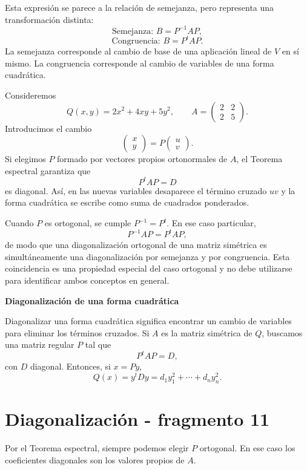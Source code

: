 Esta expresión se parece a la relación de semejanza, pero representa una transformación distinta:
\[
\boxed{\text{Semejanza: }B=P^{-1}AP,}
\]
\[
\boxed{\text{Congruencia: }B=P^tAP.}
\]
La semejanza corresponde al cambio de base de una aplicación lineal de $V$ en sí mismo. La congruencia corresponde al cambio de variables de una forma cuadrática.

\begin{example}
Consideremos
\[
Q(x,y)=2x^2+4xy+5y^2,
\qquad
A=\begin{pmatrix}2&2\\2&5\end{pmatrix}.
\]
Introducimos el cambio
\[
\begin{pmatrix}x\\y\end{pmatrix}
=P\begin{pmatrix}u\\v\end{pmatrix}.
\]
Si elegimos $P$ formado por vectores propios ortonormales de $A$, el Teorema espectral garantiza que
\[
P^tAP=D
\]
es diagonal. Así, en las nuevas variables desaparece el término cruzado $uv$ y la forma cuadrática se escribe como suma de cuadrados ponderados.
\end{example}

Cuando $P$ es ortogonal, se cumple $P^{-1}=P^t$. En ese caso particular,
\[
P^{-1}AP=P^tAP,
\]
de modo que una diagonalización ortogonal de una matriz simétrica es simultáneamente una diagonalización por semejanza y por congruencia. Esta coincidencia es una propiedad especial del caso ortogonal y no debe utilizarse para identificar ambos conceptos en general.

\textbf{Diagonalización de una forma cuadrática}

Diagonalizar una forma cuadrática significa encontrar un cambio de variables para eliminar los términos cruzados. Si $A$ es la matriz simétrica de $Q$, buscamos una matriz regular $P$ tal que
\[
P^tAP=D,
\]
con $D$ diagonal. Entonces, si $x=Py$,
\[
Q(x)=y^tDy
=d_1y_1^2+\cdots+d_ny_n^2.
\]


\section{Diagonalización - fragmento 11}
Por el Teorema espectral, siempre podemos elegir $P$ ortogonal. En ese caso los coeficientes diagonales son los valores propios de $A$.

